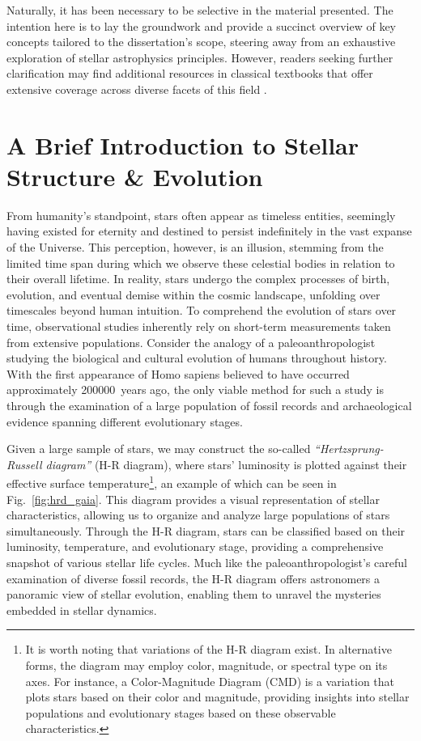 \documentclass[main.tex]{subfiles}
\begin{document}
    Naturally, it has been necessary to be selective in the material presented. The intention here is to lay the groundwork and provide a succinct overview of key concepts tailored to the dissertation's scope, steering away from an exhaustive exploration of stellar astrophysics principles. However, readers seeking further clarification may find additional resources in classical textbooks that offer extensive coverage across diverse facets of this field \citep[e.g.,][]{Clayton, Prialnik, Eggleton, Kippenhahn, Carroll_Ostlie_2017}.

    
    {\hypersetup{linkcolor=black, pdfborder=0 0 1}
    \adjustmtc
    \adjustmtc
    \minitoc
    \newpage
    }
    
    
    
    \section{A Brief Introduction to Stellar Structure \& Evolution}
    From humanity's standpoint, stars often appear as timeless entities, seemingly having existed for eternity and destined to persist indefinitely in the vast expanse of the Universe. This perception, however, is an illusion, stemming from the limited time span during which we observe these celestial bodies in relation to their overall lifetime. In reality, stars undergo the complex processes of birth, evolution, and eventual demise within the cosmic landscape, unfolding over timescales beyond human intuition. To comprehend the evolution of stars over time, observational studies inherently rely on short-term measurements taken from extensive populations.
    Consider the analogy of a paleoanthropologist studying the biological and cultural evolution of humans throughout history. With the first appearance of Homo sapiens believed to have occurred approximately \SI{200000}{years} ago, the only viable method for such a study is through the examination of a large population of fossil records and archaeological evidence spanning different evolutionary stages.

    Given a large sample of stars, we may construct the so-called \textit{``Hertzsprung-Russell diagram''} (H-R diagram), where stars' luminosity is plotted against their effective surface temperature\footnote{It is worth noting that variations of the H-R diagram exist. In alternative forms, the diagram may employ color, magnitude, or spectral type on its axes. For instance, a Color-Magnitude Diagram (CMD) is a variation that plots stars based on their color and magnitude, providing insights into stellar populations and evolutionary stages based on these observable characteristics.}, an example of which can be seen in Fig.~\ref{fig:hrd_gaia}. This diagram provides a visual representation of stellar characteristics, allowing us to organize and analyze large populations of stars simultaneously. Through the H-R diagram, stars can be classified based on their luminosity, temperature, and evolutionary stage, providing a comprehensive snapshot of various stellar life cycles. Much like the paleoanthropologist's careful examination of diverse fossil records, the H-R diagram offers astronomers a panoramic view of stellar evolution, enabling them to unravel the mysteries embedded in stellar dynamics.
\end{document}
